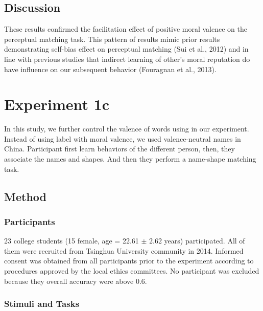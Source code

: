 \documentclass[
  english,
  man]{apa6}
\begin{document}
\hypertarget{discussion}{%
\subsection{Discussion}\label{discussion}}

These results confirmed the facilitation effect of positive moral valence on the perceptual matching task. This pattern of results mimic prior results demonstrating self-bias effect on perceptual matching (Sui et al., 2012) and in line with previous studies that indirect learning of other's moral reputation do have influence on our subsequent behavior (Fouragnan et al., 2013).

\hypertarget{experiment-1c}{%
\section{Experiment 1c}\label{experiment-1c}}

In this study, we further control the valence of words using in our experiment. Instead of using label with moral valence, we used valence-neutral names in China. Participant first learn behaviors of the different person, then, they associate the names and shapes. And then they perform a name-shape matching task.

\hypertarget{method-1}{%
\subsection{Method}\label{method-1}}

\hypertarget{participants-2}{%
\subsubsection{Participants}\label{participants-2}}

23 college students (15 female, age = 22.61 \(\pm\) 2.62 years) participated. All of them were recruited from Tsinghua University community in 2014. Informed consent was obtained from all participants prior to the experiment according to procedures approved by the local ethics committees. No participant was excluded because they overall accuracy were above 0.6.

\hypertarget{stimuli-and-tasks-2}{%
\subsubsection{Stimuli and Tasks}\label{stimuli-and-tasks-2}}
\end{document}
